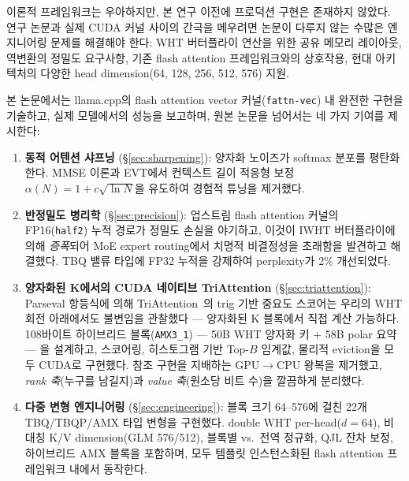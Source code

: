 \documentclass[10pt,twocolumn]{article}
\begin{document}
이론적 프레임워크는 우아하지만, 본 연구 이전에 프로덕션 구현은 존재하지 않았다. 연구 논문과 실제 CUDA 커널 사이의 간극을 메우려면 논문이 다루지 않는 수많은 엔지니어링 문제를 해결해야 한다: WHT 버터플라이 연산을 위한 공유 메모리 레이아웃, 역변환의 정밀도 요구사항, 기존 flash attention 프레임워크와의 상호작용, 현대 아키텍처의 다양한 head dimension(64, 128, 256, 512, 576) 지원.

본 논문에서는 llama.cpp의 flash attention vector 커널(\texttt{fattn-vec}) 내 완전한 구현을 기술하고, 실제 모델에서의 성능을 보고하며, 원본 논문을 넘어서는 네 가지 기여를 제시한다:

\begin{enumerate}[leftmargin=*,topsep=2pt,itemsep=1pt]
\item \textbf{동적 어텐션 샤프닝} (\S\ref{sec:sharpening}): 양자화 노이즈가 softmax 분포를 평탄화한다. MMSE 이론과 EVT에서 컨텍스트 길이 적응형 보정 $\alpha(N) = 1 + c\sqrt{\ln N}$을 유도하여 경험적 튜닝을 제거했다.

\item \textbf{반정밀도 병리학} (\S\ref{sec:precision}): 업스트림 flash attention 커널의 FP16(\texttt{half2}) 누적 경로가 정밀도 손실을 야기하고, 이것이 IWHT 버터플라이에 의해 \emph{증폭}되어 MoE expert routing에서 치명적 비결정성을 초래함을 발견하고 해결했다. TBQ 밸류 타입에 FP32 누적을 강제하여 perplexity가 2\% 개선되었다.

\item \textbf{양자화된 K에서의 CUDA 네이티브 TriAttention} (\S\ref{sec:triattention}): Parseval 항등식에 의해 TriAttention~\cite{triattention2026}의 trig 기반 중요도 스코어는 우리의 WHT 회전 아래에서도 불변임을 관찰했다 --- 양자화된 K 블록에서 직접 계산 가능하다. 108바이트 하이브리드 블록(\texttt{AMX3\_1}) --- 50B WHT 양자화 키 + 58B polar 요약 --- 을 설계하고, 스코어링, 히스토그램 기반 Top-$B$ 임계값, 물리적 eviction을 모두 CUDA로 구현했다. 참조 구현을 지배하는 GPU$\to$CPU 왕복을 제거했고, \emph{rank 축}(누구를 남길지)과 \emph{value 축}(원소당 비트 수)을 깔끔하게 분리했다.

\item \textbf{다중 변형 엔지니어링} (\S\ref{sec:engineering}): 블록 크기 64--576에 걸친 22개 TBQ/TBQP/AMX 타입 변형을 구현했다. double WHT per-head($d=64$), 비대칭 K/V dimension(GLM 576/512), 블록별 vs.\ 전역 정규화, QJL 잔차 보정, 하이브리드 AMX 블록을 포함하며, 모두 템플릿 인스턴스화된 flash attention 프레임워크 내에서 동작한다.
\end{enumerate}

\end{document}
